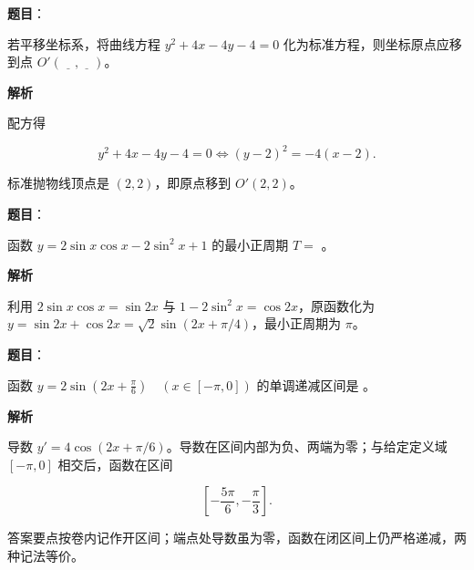 \begin{answer}

\textbf{题目}：

若平移坐标系，将曲线方程 $y^2+4x-4y-4=0$ 化为标准方程，则坐标原点应移到点 $O'(\underline{\quad},\underline{\quad})$。

\textbf{解析}

配方得

\nopagebreak[4]
\[
y^2+4x-4y-4=0\iff (y-2)^2=-4(x-2).
\]

标准抛物线顶点是 $(2,2)$，即原点移到 $O'(2,2)$。


\end{answer}
\begin{answer}

\textbf{题目}：

函数 $y=2\sin x\cos x-2\sin^2x+1$ 的最小正周期 $T=$ \gkblank{}。

\textbf{解析}

利用 $2\sin x\cos x=\sin2x$ 与 $1-2\sin^2x=\cos2x$，原函数化为 $y=\sin2x+\cos2x=\sqrt2\sin(2x+\pi/4)$，最小正周期为 $\pi$。


\end{answer}
\begin{answer}

\textbf{题目}：

函数 $y=2\sin\left(2x+\frac\pi6\right)\quad (x\in[-\pi,0])$ 的单调递减区间是 \gkblank{}。

\textbf{解析}

导数 $y'=4\cos(2x+\pi/6)$。导数在区间内部为负、两端为零；与给定定义域 $[-\pi,0]$ 相交后，函数在区间

\nopagebreak[4]
\[
\left[-\frac{5\pi}{6},-\frac\pi3\right].
\]

答案要点按卷内记作开区间；端点处导数虽为零，函数在闭区间上仍严格递减，两种记法等价。


\end{answer}
